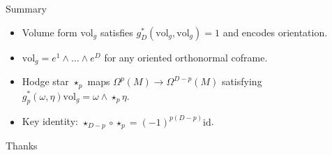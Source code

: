 \begin{frame}{Summary}
\begin{block}{}
\begin{itemize}
\item Volume form $\mathrm{vol}_g$ satisfies $g^*_D(\mathrm{vol}_g,\mathrm{vol}_g)=1$ and encodes orientation.
\item $\mathrm{vol}_g=e^1\wedge\dots\wedge e^D$ for any oriented orthonormal coframe.
\item Hodge star $\star_p$ maps $\Omega^p(M)\to\Omega^{D-p}(M)$ satisfying
$g^*_p(\omega,\eta)\mathrm{vol}_g=\omega\wedge\star_p\eta$.
\item Key identity: $\star_{D-p}\circ\star_p=(-1)^{p(D-p)}\mathrm{id}$.
\end{itemize}
\end{block}
\end{frame}


\begin{frame}{Thanks}
  \cmcendframe
\end{frame}


